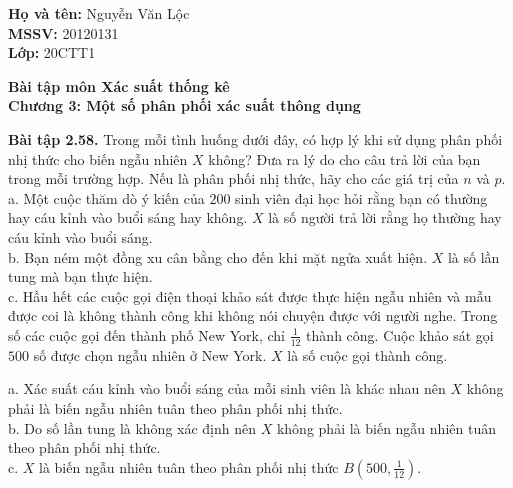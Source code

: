 \documentclass[12pt,a4paper]{article}
\author{Nguyễn Văn Lộc}
\begin{document}
    \fancyhf{}
    \lhead{}
    \chead{}
    \rhead{}
    \cfoot{}
    \rfoot{\thepage}
    \lfoot{}
    \pagestyle{fancy}
    \renewcommand{\headrulewidth}{0pt}
    \renewcommand{\footrulewidth}{0pt}
    \begin{mybox}
    \textbf{Họ và tên:} Nguyễn Văn Lộc\\
    \textbf{MSSV:} 20120131\\
    \textbf{Lớp:} 20CTT1
    \end{mybox}
    \begin{center}
    \fontsize{16}{14}\selectfont
    \textbf{Bài tập môn Xác suất thống kê}\\
    \textbf{Chương 3: Một số phân phối xác suất thông dụng}
    \end{center}
    
\begin{mybox}
\textbf{Bài tập 2.58.} Trong mỗi tình huống dưới đây, có hợp lý khi sử dụng phân phối nhị thức cho biến ngẫu nhiên $X$ không? Đưa ra lý do cho câu trả lời của bạn trong mỗi trường hợp. Nếu là phân phối nhị thức, hãy cho các giá trị của $n$ và $p.$\\
a. Một cuộc thăm dò ý kiến của $200$ sinh viên đại học hỏi rằng bạn có thường hay cáu kỉnh vào buổi sáng hay không. $X$ là số người trả lời rằng họ thường hay cáu kỉnh vào buổi sáng.\\
b. Bạn ném một đồng xu cân bằng cho đến khi mặt ngửa xuất hiện. $X$ là số lần tung mà bạn thực hiện.\\
c. Hầu hết các cuộc gọi điện thoại khảo sát được thực hiện ngẫu nhiên và mẫu được coi là không thành công khi không nói chuyện được với người nghe. Trong số các cuộc gọi đến thành phố New York, chỉ $\frac{1}{12}$ thành công. Cuộc khảo sát gọi $500$ số được chọn ngẫu nhiên ở New York. $X$ là số cuộc gọi thành công. 
\end{mybox}
a. Xác suất cáu kỉnh vào buổi sáng của mỗi sinh viên là khác nhau nên $X$ không phải là biến ngẫu nhiên tuân theo phân phối nhị thức.\\
b. Do số lần tung là không xác định nên $X$ không phải là biến ngẫu nhiên tuân theo phân phối nhị thức.\\
c. $X$ là biến ngẫu nhiên tuân theo phân phối nhị thức $B \left( {500, \frac{1}{12}} \right).$ 
 
\end{document}
